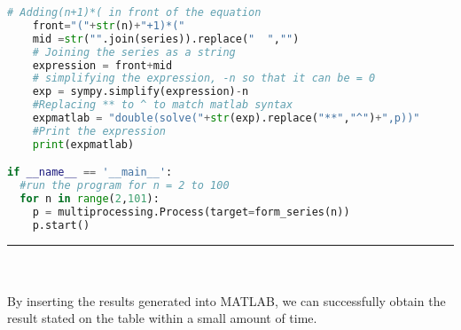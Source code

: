 \begin{lstlisting}[language=Python]
    # Adding(n+1)*( in front of the equation
    front="("+str(n)+"+1)*("
    mid =str("".join(series)).replace("  ","")
    # Joining the series as a string
    expression = front+mid
    # simplifying the expression, -n so that it can be = 0
    exp = sympy.simplify(expression)-n
    #Replacing ** to ^ to match matlab syntax
    expmatlab = "double(solve("+str(exp).replace("**","^")+",p))"
    #Print the expression
    print(expmatlab)

if __name__ == '__main__':
  #run the program for n = 2 to 100
  for n in range(2,101):
    p = multiprocessing.Process(target=form_series(n))
    p.start()
\end{lstlisting}
\hrule
\\
\\
By inserting the results generated into MATLAB, we can successfully obtain the result stated on the table within a small amount of time.